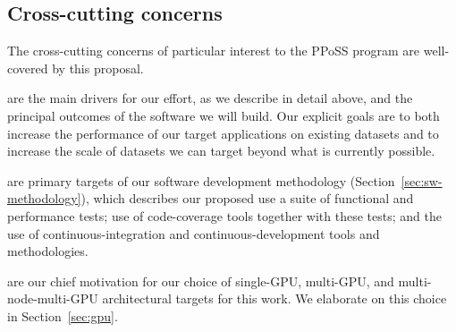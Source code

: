 
\subsection{Cross-cutting concerns}

The cross-cutting concerns of particular interest to the PPoSS program are well-covered by this proposal.

\begin{description}
  \item[Scalability and performance] are the main drivers for our effort, as we describe in detail above, and the principal outcomes of the software we will build. Our explicit goals are to both increase the performance of our target applications on existing datasets and to increase the scale of datasets we can target beyond what is currently possible.

  \item[Correctness and accuracy] are primary targets of our software development methodology (Section~\ref{sec:sw-methodology}), which describes our proposed use a suite of functional and performance tests; use of code-coverage tools together with these tests; and the use of continuous-integration and continuous-development tools and methodologies.

  \item[The capabilities of heterogeneous architectures] are our chief motivation for our choice of single-GPU, multi-GPU, and multi-node-multi-GPU architectural targets for this work. We elaborate on this choice in Section~\ref{sec:gpu}.


\end{description}








